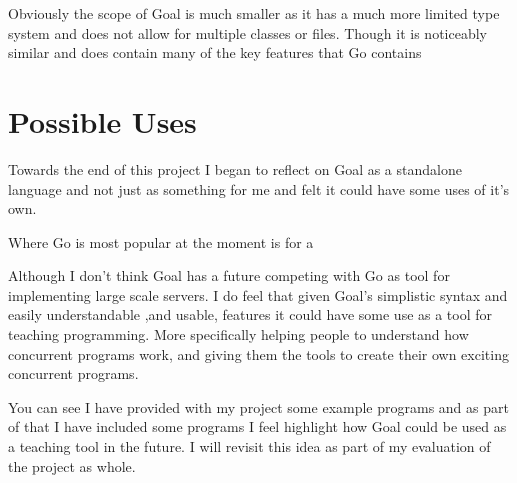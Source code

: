 Obviously the scope of Goal is much smaller as it has a much more limited type system and does not allow for multiple classes or files. Though it is noticeably similar and does contain many of the key features that Go contains 

\section{Possible Uses}

Towards the end of this project I began to reflect on Goal as a standalone language and not just as something for me and felt it could have some uses of it's own.

Where Go is most popular at the moment is for a 

Although I don't think Goal has a future competing with Go as tool for implementing large scale servers. I do feel that given Goal's simplistic syntax and easily understandable ,and usable, features it could have some use as a tool for teaching programming. More specifically helping people to understand how concurrent programs work, and giving them the tools to create their own exciting concurrent programs.

You can see I have provided with my project some example programs and as part of that I have included some programs I feel highlight how Goal could be used as a teaching tool in the future. I will revisit this idea as part of my evaluation of the project as whole.    
